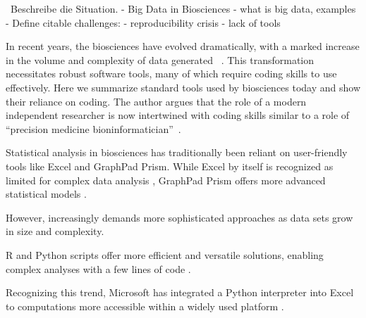

\
Beschreibe die Situation.
- Big Data in Biosciences
- what is big data, examples
- Define citable challenges:
- reproducibility crisis
- lack of tools




In recent years, the biosciences have evolved dramatically, with a marked
increase in the volume and complexity of data generated
~\cite{yangScalabilityValidationBig2017,ekmekciIntroductionProgrammingBioscientists2016}.
This transformation necessitates robust software tools, many of which require
coding skills to use effectively. Here we summarize standard tools used by
biosciences today and show their reliance on coding. The author argues that the
role of a modern independent researcher is now intertwined with coding skills
similar to a role of ``precision medicine
bioninformatician''~\cite{gomez-lopezPrecisionMedicineNeeds2019}.

Statistical analysis in biosciences has traditionally been reliant on
user-friendly tools like Excel and GraphPad Prism. While Excel by itself is
recognized as limited for complex data analysis
\cite{tanavaleeLimitationsUsingMicrosoft2016a, incertiYouStillUsing2019a},
GraphPad Prism offers more advanced statistical models .

However, increasingly demands more sophisticated
approaches as data sets grow in size and complexity.

R and Python scripts offer more efficient and
versatile solutions, enabling complex analyses with a few lines of code
\cite{rcoreteamLanguageEnvironmentStatistical2018,vallatPingouinStatisticsPython2018}.

Recognizing this trend, Microsoft has integrated a Python interpreter into Excel to
computations more accessible within a widely used platform \cite{AnnouncingPythonExcel2023}.


